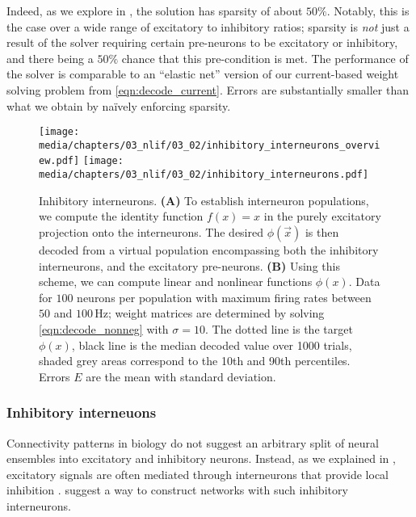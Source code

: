 Indeed, as we explore in , the \NNLS solution has sparsity of about $50\%$.
Notably, this is the case over a wide range of excitatory to inhibitory ratios; sparsity is \emph{not} just a result of the solver requiring certain pre-neurons to be excitatory or inhibitory, and there being a $50\%$ chance that this pre-condition is met.
The performance of the \NNLS solver is comparable to an \enquote{elastic net} version of our current-based weight solving problem from \cref{eqn:decode_current}.
Errors are substantially smaller than what we obtain by na\"ively enforcing sparsity.

\begin{figure}
	\texttt{[image: media/chapters/03\_nlif/03\_02/inhibitory\_interneurons\_overview.pdf]}\hspace{0.4204cm}%
	\texttt{[image: media/chapters/03\_nlif/03\_02/inhibitory\_interneurons.pdf]}%
	{\label{fig:inhibitory_interneurons_a}}%
	{\label{fig:inhibitory_interneurons_b}}%
	\caption[Inhibitory interneurons]{Inhibitory interneurons.
	\textbf{(A)} To establish interneuron populations, we compute the identity function $f(x) = x$ in the purely excitatory projection onto the interneurons.
	The desired $\phi(\vec x)$ is then decoded from a virtual population encompassing both the inhibitory interneurons, and the excitatory pre-neurons.
	\textbf{(B)} Using this scheme, we can compute linear and nonlinear functions $\phi(x)$.
	Data for $100$ neurons per population with maximum firing rates between $50$ and $100\,\mathrm{Hz}$; weight matrices are determined by solving \cref{eqn:decode_nonneg} with $\sigma = 10$.
	The dotted line is the target $\phi(x)$, black line is the median decoded value over 1000 trials, shaded grey areas correspond to the 10th and 90th percentiles.
	Errors $E$ are the mean \NRMSE with standard deviation.
	}
	\label{fig:inhibitory_interneurons}
\end{figure}

\subsubsection{Inhibitory interneuons}
Connectivity patterns in biology do not suggest an arbitrary split of neural ensembles into excitatory and inhibitory neurons.
Instead, as we explained in , excitatory signals are often mediated through interneurons that provide local inhibition \citep[e.g.,][Chapter~2]{kandel2012principles}.
\citet{parisien2008solving} suggest a way to 
construct \NEF networks with such inhibitory interneurons.

